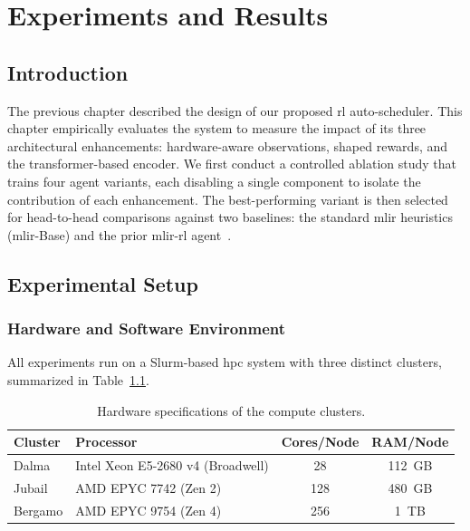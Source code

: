 \chapter{Experiments and Results}
\label{ch:experiments-results}

\section{Introduction}

The previous chapter described the design of our proposed \gls{rl} auto-scheduler. This chapter empirically evaluates the system to measure the impact of its three architectural enhancements: hardware-aware observations, shaped rewards, and the transformer-based encoder. We first conduct a controlled ablation study that trains four agent variants, each disabling a single component to isolate the contribution of each enhancement. The best-performing variant is then selected for head-to-head comparisons against two baselines: the standard \gls{mlir} heuristics (\gls{mlir}-Base) and the prior \gls{mlir}-\gls{rl} agent~\cite{tirichine2025reinforcement}.

\section{Experimental Setup}
\label{sec:experimental-setup}

\subsection{Hardware and Software Environment}

All experiments run on a Slurm-based \gls{hpc} system with three distinct clusters, summarized in Table~\ref{tab:hardware-specs}.

\begin{table}[H]
    \centering
    \caption{Hardware specifications of the compute clusters.}
    \label{tab:hardware-specs}
    \vspace{0.2cm}
    \begin{tabularx}{\textwidth}{l l c c}
        \toprule
        \textbf{Cluster} & \textbf{Processor} & \textbf{Cores/Node} & \textbf{RAM/Node} \\
        \midrule
        Dalma & Intel Xeon E5-2680 v4 (Broadwell) & 28 & 112~GB \\
        Jubail & AMD EPYC 7742 (Zen 2) & 128 & 480~GB \\
        Bergamo & AMD EPYC 9754 (Zen 4) & 256 & 1~TB \\
        \bottomrule
    \end{tabularx}
\end{table}

